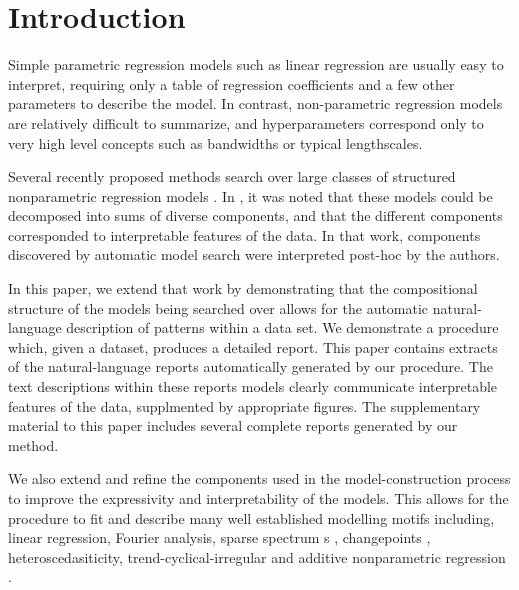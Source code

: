 \documentclass{article}
\def\ie{i.e.\ }
\def\eg{e.g.\ }
\begin{document}
\allowdisplaybreaks

\section{Introduction}

Simple parametric regression models such as linear regression are usually easy to interpret, requiring only a table of regression coefficients and a few other parameters to describe the model.
In contrast, non-parametric regression models are relatively difficult to summarize, and hyperparameters correspond only to very high level concepts such as bandwidths or typical lengthscales.

Several recently proposed methods search over large classes of structured nonparametric regression models \citep[e.g.][]{DuvLloGroetal13, kronberger2013evolution, diosan2007evolving, bing2010gp}.
In \cite{DuvLloGroetal13}, it was noted that these models could be decomposed into sums of diverse components, and that the different components corresponded to interpretable features of the data.
In that work, components discovered by automatic model search were interpreted post-hoc by the authors.

In this paper, we extend that work by demonstrating that the compositional structure of the models being searched over allows for the automatic natural-language description of patterns within a data set.  We demonstrate a procedure which, given a dataset, produces a detailed report. %
%
This paper contains extracts of the natural-language reports automatically generated by our procedure.
The text descriptions within these reports models clearly communicate interpretable features of the data, supplmented by appropriate figures.
The supplementary material to this paper includes several complete reports generated by our method.

We also extend and refine the components used in the model-construction process to improve the expressivity and interpretability of the models.
This allows for the procedure to fit and describe many well established modelling motifs including, linear regression, Fourier analysis, sparse spectrum \gp{}s \citep{lazaro2010sparse}, changepoints \citep[e.g.][]{garnett2010sequential, FoxDunson:NIPS2012}, heteroscedasiticity, trend-cyclical-irregular \citep[e.g.][]{lind2006basic} and additive nonparametric regression \citep[e.g.][]{buja1989linear}.
\end{document}
